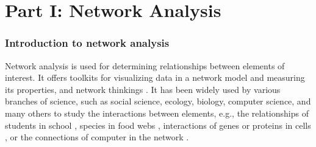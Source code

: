 \section*{Part I: Network Analysis}
\subsubsection{Introduction to network analysis}
Network analysis is used for determining relationships between elements of interest. It offers toolkits for visualizing data in a network model and measuring its properties, and network thinkings . It has been widely used by various branches of science, such as social science, ecology, biology, computer science, and many others to study the interactions between elements, e.g., the relationships of students in school , species in food webs , interactions of genes or proteins in cells , or the connections of computer in the network .

